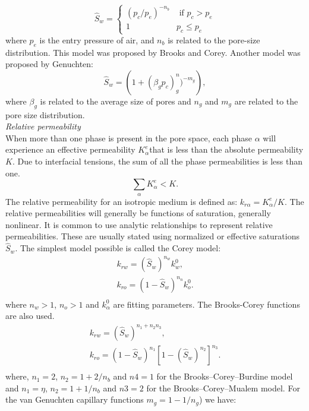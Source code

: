 \documentclass[a4paper,10pt]{report}
\begin{document}
\begin{equation*}
\hat{S}_w=
\begin{cases}
(p_c/p_e)^{-n_b} & \text{ if } p_c>p_e\\
1& p_c \leq p_e
\end{cases}
\end{equation*}
where $p_e$ is the entry pressure of air, and $n_b$ is related to the pore-size distribution. This model was proposed by Brooks and Corey.
Another model was proposed by Genuchten:
\begin{equation}
 \hat{S}_w=\left( 1+(\beta_gp_c)^n_g)^{-m_g}\right),
\end{equation}
where $\beta_g$ is related to the average size of pores and $n_g$ and $m_g$ are related to the pore size distribution. \\
\emph{Relative permeability}\\
When more than one phase is present in the pore space, each phase $\alpha$ will experience an effective permeability $K_{\alpha}^ e$that is less than the absolute permeability $K$. Due to interfacial tensions, the sum of all the phase permeabilities is less than one.
$$\sum_{\alpha}K_{\alpha}^e<K.$$
The relative permeability for an isotropic medium is defined as:
$k_{r\alpha}=K_{\alpha}^e/K.$
The relative permeabilities will generally be functions of saturation, generally nonlinear.
It is common to use analytic relationships to represent relative permeabilities. These are usually stated using normalized or effective saturations $\hat{S}_w.$ The simplest model possible is called the Corey model:
\begin{equation}\label{eq:Corey}
\begin{aligned}
k_{rw}=(\hat{S}_w)^{n_w}k_w^0,\\
k_{ro}=(1-\hat{S}_w)^{n_n}k_o^0.\\
\end{aligned}
\end{equation}
where $n_w>1$, $n_o>1$ and $k_{\alpha}^0$ are fitting parameters.
The Brooks-Corey functions are also used. 
\begin{equation*}
\begin{aligned}
k_{rw}=(\hat{S}_w)^{n_1+n_2n_3},\\
k_{ro}=(1-\hat{S}_w)^{n_1}[1-(\hat{S}_w)^{n_2}]^{n_3}.\\
\end{aligned}
\end{equation*}
where, $n_1 = 2$, $n_2 = 1 + 2/n_b$ and $n4 = 1$ for the Brooks–Corey–Burdine model and $n_1 = \eta$, $n_2 = 1 + 1/n_b$ and $n3 = 2$ for the Brooks–Corey–Mualem model. For the van Genuchten capillary functions $m_g = 1 − 1/n_g$) we have:
\end{document}
